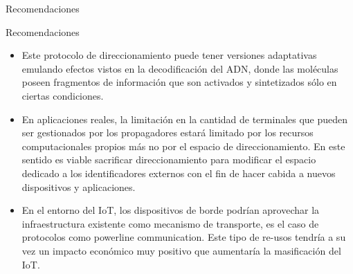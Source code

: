 \begin{frame}{Recomendaciones}
  \begin{block}{Recomendaciones}
   \begin{itemize}
   \justifying
    \item<1->  Este protocolo de direccionamiento puede tener versiones adaptativas emulando efectos vistos en la decodificación del ADN, donde las moléculas poseen fragmentos de información que son activados y sintetizados sólo en ciertas condiciones.
    \item<1->  En aplicaciones reales, la limitación en la cantidad de terminales que pueden ser gestionados por los propagadores estará limitado por los recursos computacionales propios más no por el espacio de direccionamiento. En este sentido es viable sacrificar direccionamiento para modificar el espacio dedicado a los identificadores externos con el fin de hacer cabida a nuevos dispositivos y aplicaciones.
    \item<1-> En el entorno del IoT, los dispositivos de borde podrían aprovechar la infraestructura existente como mecanismo de transporte, es el caso de protocolos como powerline communication. Este tipo de re-usos tendría a su vez un impacto económico muy positivo que aumentaría la masificación del IoT.  
    \end{itemize}
  \end{block}
\end{frame}